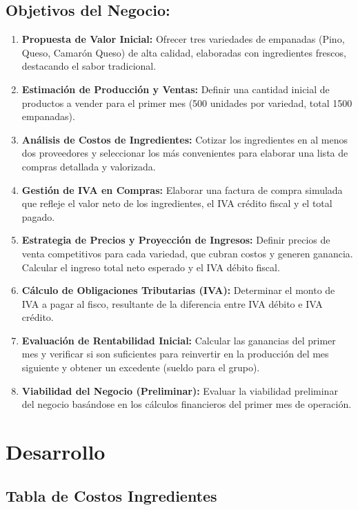 \documentclass[12pt]{article}
\begin{document}
\subsection{Objetivos del Negocio:}
\begin{enumerate}
    \item \textbf{Propuesta de Valor Inicial:} Ofrecer tres variedades de empanadas (Pino, Queso, Camarón Queso) de alta calidad, elaboradas con ingredientes frescos, destacando el sabor tradicional.
    \item \textbf{Estimación de Producción y Ventas:} Definir una cantidad inicial de productos a vender para el primer mes (500 unidades por variedad, total 1500 empanadas).
    \item \textbf{Análisis de Costos de Ingredientes:} Cotizar los ingredientes en al menos dos proveedores y seleccionar los más convenientes para elaborar una lista de compras detallada y valorizada.
    \item \textbf{Gestión de IVA en Compras:} Elaborar una factura de compra simulada que refleje el valor neto de los ingredientes, el IVA crédito fiscal y el total pagado.
    \item \textbf{Estrategia de Precios y Proyección de Ingresos:} Definir precios de venta competitivos para cada variedad, que cubran costos y generen ganancia. Calcular el ingreso total neto esperado y el IVA débito fiscal.
    \item \textbf{Cálculo de Obligaciones Tributarias (IVA):} Determinar el monto de IVA a pagar al fisco, resultante de la diferencia entre IVA débito e IVA crédito.
    \item \textbf{Evaluación de Rentabilidad Inicial:} Calcular las ganancias del primer mes y verificar si son suficientes para reinvertir en la producción del mes siguiente y obtener un excedente (sueldo para el grupo).
    \item \textbf{Viabilidad del Negocio (Preliminar):} Evaluar la viabilidad preliminar del negocio basándose en los cálculos financieros del primer mes de operación.

\end{enumerate}

\newpage



\section{Desarrollo} %

\subsection{Tabla de Costos Ingredientes}
\end{document}
